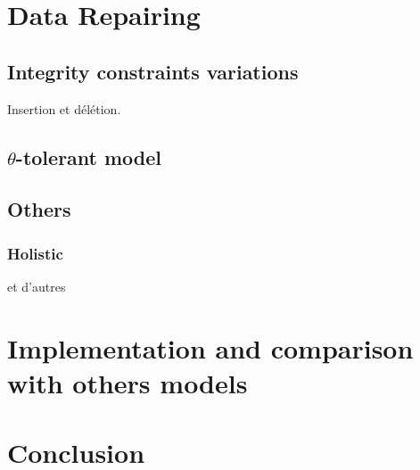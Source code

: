 \documentclass[letterpaper, 12pt]{report}
\begin{document}
\section{}

\chapter{Data Repairing}
\section{Integrity constraints variations}
Insertion et délétion.
\section{$\theta$-tolerant model}
\section{Others}
\subsection{Holistic}
 et d'autres

\chapter{Implementation and comparison with others models}
\chapter{Conclusion}






\newpage
\appendix
\end{document}
